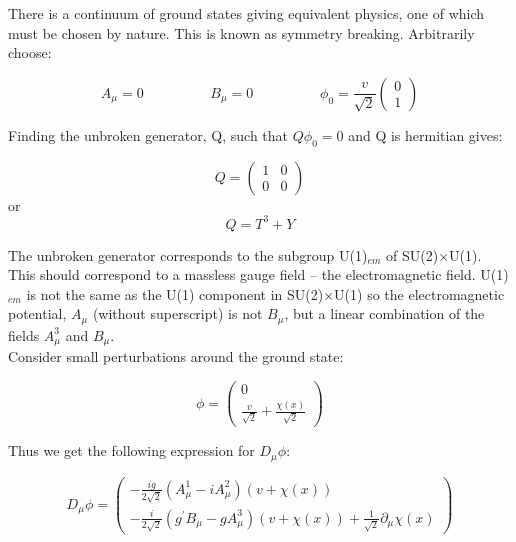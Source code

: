There is a continuum of ground states giving equivalent physics, one of which
must be chosen by nature. This is known as symmetry breaking. Arbitrarily 
choose:

\begin{equation}
A_{\mu} = 0 \hspace{2cm} B_{\mu} = 0 \hspace{2cm} \phi_{0} =
\frac{v}{\sqrt{2}}\left(\begin{array}{c}0\\1\end{array}\right)
\end{equation}

Finding the unbroken generator, Q, such that $Q\phi_{0} = 0$ and Q is hermitian
gives:

\begin{equation}
Q = \left(\begin{array}{cc}1&0\\0&0\end{array}\right)
\end{equation}
or
\begin{equation}
Q = T^{3} + Y 
\end{equation}

The unbroken generator corresponds to the subgroup U(1)$_{em}$ of
SU(2)$\times$U(1). This should correspond to a massless gauge field -- the
electromagnetic field. U(1)$_{em}$ is not the same as the U(1) component in
SU(2)$\times$U(1) so the electromagnetic potential, $A_{\mu}$ (without
superscript) is not $B_{\mu}$, but a linear combination of the fields
$A_{\mu}^{3}$ and $B_{\mu}$. \\

Consider small perturbations around the ground state:

\begin{equation}
\phi = \left(
\begin{array}{c}
0 \\ 
\frac{v}{\sqrt{2}} + \frac{\chi(x)}{\sqrt{2}}
\end{array}
\right)
\end{equation}

Thus we get the following expression for $D_{\mu}\phi$:

\begin{equation}
D_{\mu}\phi = \left(
\begin{array}{c}
-\frac{ig}{2\sqrt{2}}\left(A_{\mu}^{1} - iA_{\mu}^{2}\right)(v + \chi(x)) \\
-\frac{i}{2\sqrt{2}}\left(g^{\prime}B_{\mu} - gA_{\mu}^{3}\right)(v + \chi(x)) +
\frac{1}{\sqrt{2}}\partial_{\mu}\chi(x)
\end{array}
\right)
\end{equation}


